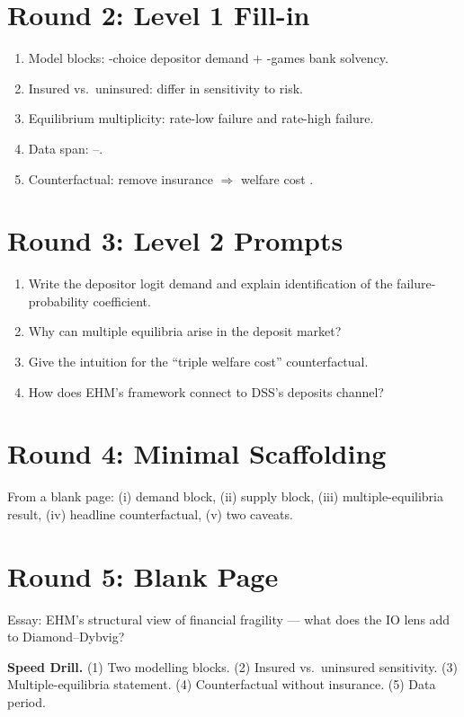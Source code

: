\documentclass[11pt]{article}
\newcommand{\blank}[1]{\underline{\hspace{#1}}}
\begin{document}
\section*{Round 2: Level 1 Fill-in}
\begin{enumerate}
\item Model blocks: \blank{2cm}-choice depositor demand $+$ \blank{2cm}-games bank solvency.
\item Insured vs.\ uninsured: differ in sensitivity to \blank{2cm} risk.
\item Equilibrium multiplicity: \blank{1cm} rate-low failure and \blank{1cm} rate-high failure.
\item Data span: \blank{1cm}--\blank{1cm}.
\item Counterfactual: remove insurance $\Rightarrow$ welfare cost \blank{1cm}.
\end{enumerate}

\section*{Round 3: Level 2 Prompts}
\begin{enumerate}
\item Write the depositor logit demand and explain identification of the failure-probability coefficient.
\item Why can multiple equilibria arise in the deposit market?
\item Give the intuition for the ``triple welfare cost'' counterfactual.
\item How does EHM's framework connect to DSS's deposits channel?
\end{enumerate}

\section*{Round 4: Minimal Scaffolding}
From a blank page: (i) demand block, (ii) supply block, (iii) multiple-equilibria result, (iv) headline counterfactual, (v) two caveats.

\section*{Round 5: Blank Page}
Essay: EHM's structural view of financial fragility --- what does the IO lens add to Diamond--Dybvig?

\vspace{6pt}
\begin{drillbox}
\textbf{Speed Drill.} (1) Two modelling blocks. (2) Insured vs.\ uninsured sensitivity. (3) Multiple-equilibria statement. (4) Counterfactual without insurance. (5) Data period.
\end{drillbox}
\end{document}

